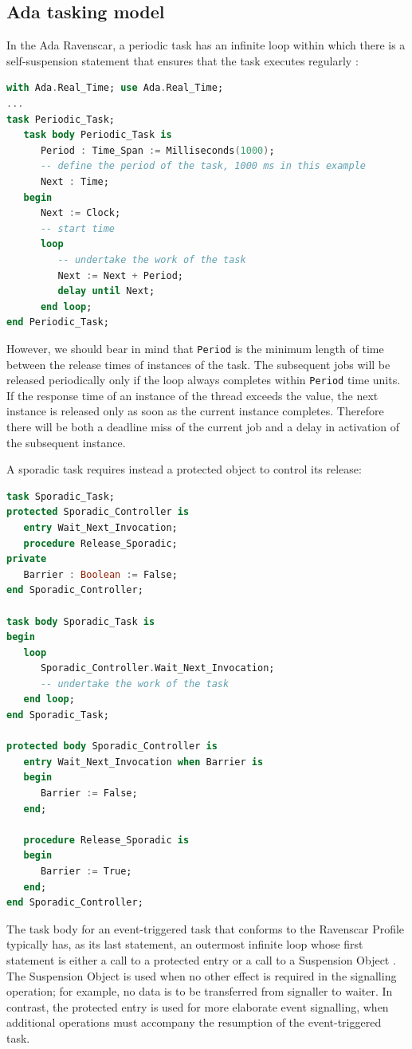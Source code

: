 \documentclass{article}
\begin{document}
\subsection{Ada tasking model}

In the Ada Ravenscar, a periodic task has an infinite loop within which there is a self-suspension statement that ensures that the task executes regularly \cite{ada-tasks}:

\begin{lstlisting}[language=Ada]
with Ada.Real_Time; use Ada.Real_Time;
...
task Periodic_Task;
   task body Periodic_Task is
      Period : Time_Span := Milliseconds(1000);
      -- define the period of the task, 1000 ms in this example
      Next : Time;
   begin
      Next := Clock;
      -- start time
      loop
         -- undertake the work of the task
         Next := Next + Period;
         delay until Next;
      end loop;
end Periodic_Task;
\end{lstlisting}

However, we should bear in mind that \texttt{Period} is the minimum length of time between the release times of instances of the task. The subsequent jobs will be released periodically only if the loop always completes within \texttt{Period} time units. If the response time of an instance of the thread exceeds the value, the next instance is released only as soon as the current instance completes. Therefore there will be both a deadline miss of the current job and a delay in activation of the subsequent instance.

A sporadic task requires instead a protected object to control its release:

\begin{lstlisting}[language=Ada]
task Sporadic_Task;
protected Sporadic_Controller is
   entry Wait_Next_Invocation;
   procedure Release_Sporadic;
private
   Barrier : Boolean := False;
end Sporadic_Controller;

task body Sporadic_Task is
begin
   loop
      Sporadic_Controller.Wait_Next_Invocation;
      -- undertake the work of the task
   end loop;
end Sporadic_Task;

protected body Sporadic_Controller is
   entry Wait_Next_Invocation when Barrier is
   begin
      Barrier := False;
   end;

   procedure Release_Sporadic is
   begin
      Barrier := True;
   end;
end Sporadic_Controller;
\end{lstlisting}

The task body for an event-triggered task that conforms to the Ravenscar Profile typically has, as its last statement, an outermost infinite loop whose first statement is either a call to a protected entry or a call to a Suspension Object \cite{ycs}. The Suspension Object is used when no other effect is required in the signalling operation; for example, no data is to be transferred from signaller to waiter. In contrast, the protected entry is used for more elaborate event signalling, when additional operations must accompany the resumption of the event-triggered task.
\end{document}
